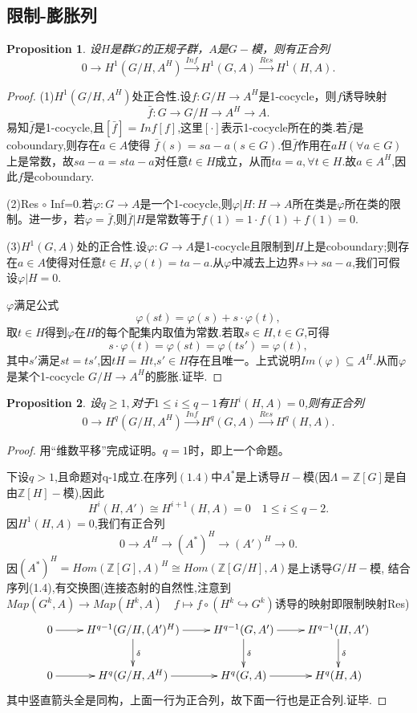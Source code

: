 \documentclass[UTF8]{article}
\newtheorem{prop}{Proposition}[section]
\begin{document}
\subsection{限制-膨胀列}
\begin{prop}
	设$H$是群$G$的正规子群，$A$是$G-$模，则有正合列$$
	0\rightarrow H^{1}(G/H,A^{H})\stackrel{Inf}{\longrightarrow} H^{1}(G,A)\stackrel{Res}{\longrightarrow}H^{1}(H,A).
	$$
\end{prop}
\begin{proof}
	(1)$H^{1}(G/H,A^{H})$处正合性.设$f:G/H\rightarrow A^{H}$是1-cocycle，则$f$诱导映射
	$$\bar{f}:G\rightarrow G/H\rightarrow A^{H}\rightarrow A.$$
	易知$\bar{f}$是1-cocycle,且$[\bar{f}]=Inf[f]$,这里$[\cdot]$表示1-cocycle所在的类.若$\bar{f}$是coboundary,则存在$a\in A$使得
	$\bar{f}(s)=sa-a(s\in G).$但$\bar{f}$作用在$aH(\forall a\in G)$上是常数，故$sa-a=sta-a$对任意$t\in H$成立，从而$ta=a,\forall t\in H.
	$故$a\in A^{H}$,因此$f$是coboundary.
	
	(2)Res $\circ$ Inf=0.若$\varphi:G\rightarrow A$是一个1-cocycle,则$\varphi|H:H\rightarrow A$所在类是$\varphi$所在类的限制。进一步，若$\varphi=\bar{f}$,则$\bar{f}|H$是常数等于$f(1)=1\cdot f(1)+f(1)=0.$
	
	(3)$H^{1}(G,A)$处的正合性.设$\varphi:G\rightarrow A$是1-cocycle且限制到$H$上是coboundary;则存在$a\in A$使得对任意$t\in H,\varphi(t)=ta-a$.从$\varphi$中减去上边界$s\mapsto sa-a$,我们可假设$\varphi|H=0.$
	
	$\varphi$满足公式$$
	\varphi(st)=\varphi(s)+s\cdot \varphi(t),
	$$
	取$t\in H$得到$\varphi$在$H$的每个配集内取值为常数.若取$s\in H,t\in G$,可得$$
	s\cdot\varphi(t)= \varphi(st)=\varphi(ts')=\varphi(t),
	$$
	其中$s'$满足$st=ts'$,因$tH=Ht$,$s'\in H$存在且唯一。上式说明$Im(\varphi)\subseteq A^{H}.$从而$\varphi$是某个1-cocycle 
	$G/H\rightarrow A^{H}$的膨胀.证毕.
\end{proof}
\begin{prop}
	设$q\geq 1,$对于$1\leq i\leq q-1$有$H^{i}(H,A)=0$,则有正合列$$
	0\rightarrow H^{q}(G/H,A^{H})\stackrel{Inf}{\longrightarrow }H^{q}(G,A)\stackrel{Res}{\longrightarrow}H^{q}(H,A).
	$$
\end{prop}
\begin{proof}
	用“维数平移”完成证明。$q=1$时，即上一个命题。
	
	下设$q>1$,且命题对q-1成立.在序列$(1.4)$中$A^{*}$是上诱导$H-$模(因$\Lambda=\mathbb{Z}[G]$是自由$\mathbb{Z}[H]-$模),因此
	$$
	H^{i}(H,A')\cong H^{i+1}(H,A)=0  \quad 1\leq i\leq q-2.
	$$
	因$H^{1}(H,A)=0$,我们有正合列$$
	0\rightarrow A^{H}\rightarrow (A^{*})^{H}\rightarrow (A')^{H}\rightarrow 0.
	$$
	因$(A^{*})^{H}=Hom(\mathbb{Z}[G],A)^{H}\cong Hom(\mathbb{Z}[G/H],A)$是上诱导$G/H-$模,
	结合序列(1.4),有交换图(连接态射的自然性,注意到$Map(G^{k},A)\rightarrow Map(H^{k},A)\quad f\mapsto f\circ(H^{k}\hookrightarrow G^{k})$诱导的映射即限制映射Res)
	$$
	\xymatrix{
0\ar[r]&H^{q-1}(G/H,(A')^{H})\ar[r]\ar[d]^{\delta}&H^{q-1}(G,A')\ar[r]\ar[d]^{\delta}&H^{q-1}(H,A')\ar[d]^{\delta}\\
0\ar[r]&	H^{q}(G/H,A^{H})\ar[r]&H^{q}(G,A)\ar[r]&H^{q}(H,A)
}
	$$
	其中竖直箭头全是同构，上面一行为正合列，故下面一行也是正合列.证毕.
\end{proof}
\end{document}
